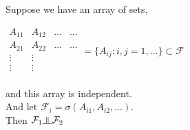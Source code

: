 \documentclass[11pt,fleqn]{book} %
\newcommand{\indep}{\rotatebox[origin=c]{90}{$\models$}}
\begin{document}
\begin{corollary}
	Suppose we have an array of sets, 

	$\begin{matrix}
			A_{11} & A_{12} & \dots & \dots\\
			A_{21} & A_{22} & \dots & \dots\\ 
			\vdots & \vdots & &\\
  			\vdots & \vdots & &\\
		\end{matrix} = \{A_{ij}: i,j = 1, \dots \} \subset \mathcal{F}$

		and this array is independent. \\

		And let $\mathcal{F}_i = \sigma(A_{i1}, A_{i2}, \dots)$.\\

		Then $\mathcal{F}_1 \indep \mathcal{F}_2$
\end{corollary}
\end{document}

